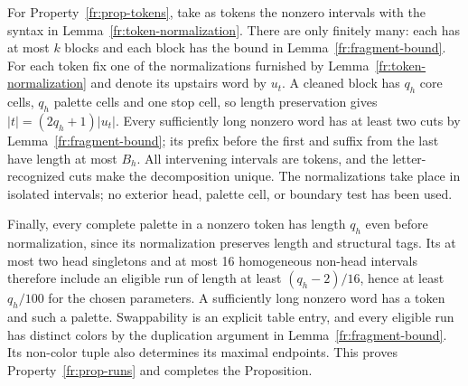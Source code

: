 For Property~\ref{fr:prop-tokens}, take as tokens the nonzero
intervals with the syntax in Lemma~\ref{fr:token-normalization}.
There are only finitely many: each has at most $k$ blocks and
each block has the bound in Lemma~\ref{fr:fragment-bound}.
For each token fix one of the normalizations furnished by
Lemma~\ref{fr:token-normalization} and denote its upstairs word
by $u_t$.  A cleaned block has $q_h$ core cells, $q_h$ palette
cells and one stop cell, so length preservation gives
$|t|=(2q_h+1)|u_t|$.  Every sufficiently long nonzero word has
at least two cuts by Lemma~\ref{fr:fragment-bound}; its prefix
before the first and suffix from the last have length at most
$B_h$.  All intervening intervals are tokens, and the
letter-recognized cuts make the decomposition unique.  The
normalizations take place in isolated intervals; no exterior
head, palette cell, or boundary test has been used.

Finally, every complete palette in a nonzero token has length
$q_h$ even before normalization, since its normalization
preserves length and structural tags.  Its at most two head
singletons and at most 16 homogeneous non-head intervals
therefore include an eligible run of length at least
$(q_h-2)/16$, hence at least $q_h/100$ for the chosen parameters.
A sufficiently long nonzero word has a token and such a
palette.  Swappability is an explicit table entry, and every
eligible run has distinct colors by the duplication argument
in Lemma~\ref{fr:fragment-bound}.  Its non-color tuple also
determines its maximal endpoints.  This proves
Property~\ref{fr:prop-runs} and completes the Proposition.
